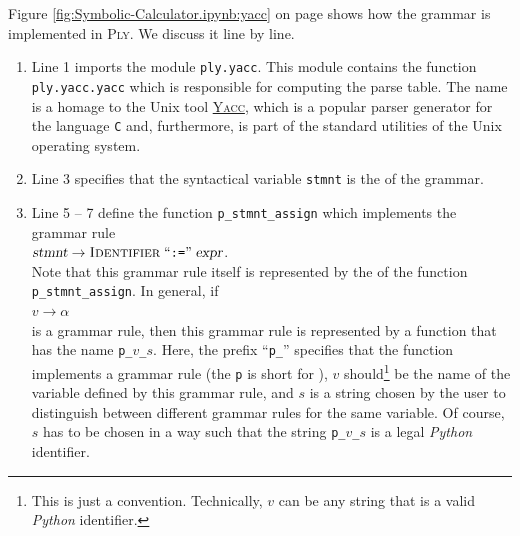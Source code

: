 Figure \ref{fig:Symbolic-Calculator.ipynb:yacc} on page \pageref{fig:Symbolic-Calculator.ipynb:yacc} shows how the
grammar is implemented in \textsc{Ply}.  We discuss it line by line.
\begin{enumerate}
\item Line 1 imports the module \texttt{ply.yacc}.  This module contains the function \texttt{ply.yacc.yacc}
      which is responsible for computing the parse table. The name  is a homage to the Unix tool
      \href{https://en.wikipedia.org/wiki/Yacc}{\textsc{Yacc}}, which is a popular parser generator for the language
      \texttt{C} and, furthermore, is part of the standard utilities of the Unix operating system.
\item Line 3 specifies that the syntactical variable \texttt{stmnt} is the  of the grammar.
\item Line 5 -- 7 define the function \texttt{p\_stmnt\_assign} which implements the grammar rule
      \\[0.2cm]
      \hspace*{1.3cm}
      $\textsl{stmnt} \rightarrow \textsc{Identifier} \;\mbox{``\texttt{:=}''}\; \textsl{expr}$.
      \\[0.2cm]
      Note that this grammar rule itself is represented by the  of the function
      \texttt{p\_stmnt\_assign}.  In general, if
      \\[0.2cm]
      \hspace*{1.3cm}
      $v \rightarrow \alpha$
      \\[0.2cm]
      is a grammar rule, then this grammar rule is represented by a function that has the name
      \texttt{p\_$v$\_$s$}.  Here, the prefix ``\texttt{p\_}'' specifies that the function implements 
      a grammar rule (the \texttt{p} is short for ), $v$ should\footnote{
        This is just a convention. Technically, $v$ can be any string that is a valid \textsl{Python}
        identifier.
      }
      be the name of the variable
      defined by this grammar rule, and $s$ is a string chosen by the user to distinguish between different
      grammar rules for the same variable.  Of course, $s$ has to be chosen in a way such that the string
      \texttt{p\_$v$\_$s$} is a legal \textsl{Python} identifier.


\end{enumerate}
